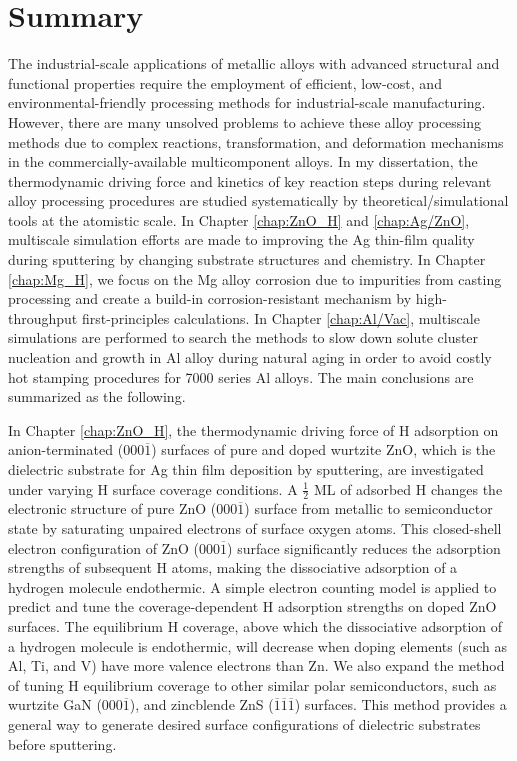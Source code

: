 \section{Summary}
\label{sec:Summary}
The industrial-scale applications of metallic alloys with advanced structural and functional properties require the employment of efficient, low-cost, and environmental-friendly processing methods for industrial-scale manufacturing.  However, there are many unsolved problems to achieve these alloy processing methods due to complex reactions, transformation, and deformation mechanisms in the commercially-available multicomponent alloys.  In my dissertation, the thermodynamic driving force and kinetics of key reaction steps during relevant alloy processing procedures are studied systematically by theoretical/simulational tools at the atomistic scale. In Chapter \ref{chap:ZnO_H} and \ref{chap:Ag/ZnO}, multiscale simulation efforts are made to improving the Ag thin-film quality during sputtering by changing substrate structures and chemistry. In Chapter \ref{chap:Mg_H}, we focus on the Mg alloy corrosion due to impurities from casting processing and create a build-in corrosion-resistant mechanism by high-throughput first-principles calculations. In Chapter \ref{chap:Al/Vac}, multiscale simulations are performed to search the methods to slow down solute cluster nucleation and growth in Al alloy during natural aging in order to avoid costly hot stamping procedures for 7000 series Al alloys. The main conclusions are summarized as the following.

In Chapter \ref{chap:ZnO_H}, the thermodynamic driving force of H adsorption on anion-terminated (000$\overline{1}$) surfaces of pure and doped wurtzite ZnO, which is the dielectric substrate for Ag thin film deposition by sputtering, are investigated under varying H surface coverage conditions. A $\frac{1}{2}$ \ac{ML} of adsorbed H changes the electronic structure of pure ZnO (000$\overline{1}$) surface from metallic to semiconductor state by saturating unpaired electrons of surface oxygen atoms. This closed-shell electron configuration of ZnO (000$\overline{1}$) surface significantly reduces the adsorption strengths of subsequent H atoms, making the dissociative adsorption of a hydrogen molecule endothermic. A simple electron counting model is applied to predict and tune the coverage-dependent H adsorption strengths on doped ZnO surfaces. The equilibrium H coverage, above which the dissociative adsorption of a hydrogen molecule is endothermic, will decrease when doping elements (such as Al, Ti, and V) have more valence electrons than Zn. We also expand the method of tuning H equilibrium coverage to other similar polar semiconductors, such as wurtzite GaN (000$\overline{1}$), and zincblende ZnS ($\overline{1}$$\overline{1}$$\overline{1}$) surfaces. This method provides a general way to generate desired surface configurations of dielectric substrates before sputtering.

